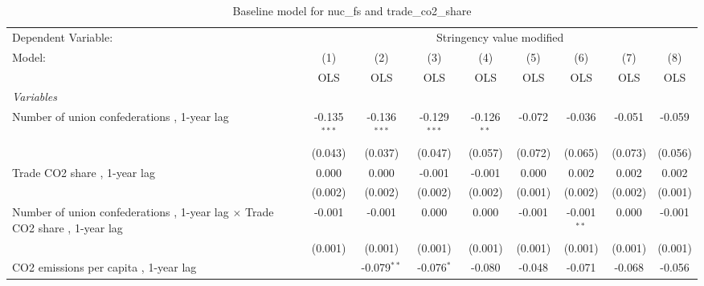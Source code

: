 
\begin{table}[htbp]
   \caption{Baseline model for nuc\_fs and trade\_co2\_share}
   \centering
   \begin{tabular}{lcccccccc}
      \toprule
      Dependent Variable: & \multicolumn{8}{c}{Stringency value modified}\\
      Model:                                                                             & (1)            & (2)            & (3)            & (4)           & (5)           & (6)           & (7)           & (8)\\  
                                                                                         &  OLS           & OLS            & OLS            & OLS           & OLS           & OLS           & OLS           & OLS\\  
      \midrule
      \emph{Variables}\\
      Number of union confederations , 1-year lag                                        & -0.135$^{***}$ & -0.136$^{***}$ & -0.129$^{***}$ & -0.126$^{**}$ & -0.072        & -0.036        & -0.051        & -0.059\\   
                                                                                         & (0.043)        & (0.037)        & (0.047)        & (0.057)       & (0.072)       & (0.065)       & (0.073)       & (0.056)\\   
      Trade CO2 share , 1-year lag                                                       & 0.000          & 0.000          & -0.001         & -0.001        & 0.000         & 0.002         & 0.002         & 0.002\\   
                                                                                         & (0.002)        & (0.002)        & (0.002)        & (0.002)       & (0.001)       & (0.002)       & (0.002)       & (0.001)\\   
      Number of union confederations , 1-year lag $\times$ Trade CO2 share , 1-year lag  & -0.001         & -0.001         & 0.000          & 0.000         & -0.001        & -0.001$^{**}$ & 0.000         & -0.001\\   
                                                                                         & (0.001)        & (0.001)        & (0.001)        & (0.001)       & (0.001)       & (0.001)       & (0.001)       & (0.001)\\   
      CO2 emissions per capita , 1-year lag                                              &                & -0.079$^{**}$  & -0.076$^{*}$   & -0.080        & -0.048        & -0.071        & -0.068        & -0.056\\   

\end{tabular}
\end{table}
